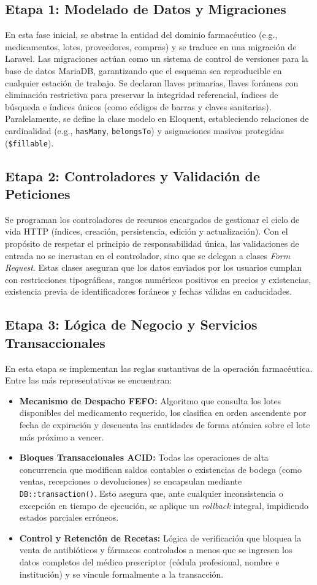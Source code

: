 \subsection{Etapa 1: Modelado de Datos y Migraciones}
En esta fase inicial, se abstrae la entidad del dominio farmacéutico (e.g., medicamentos, lotes, proveedores, compras) y se traduce en una migración de Laravel. Las migraciones actúan como un sistema de control de versiones para la base de datos MariaDB, garantizando que el esquema sea reproducible en cualquier estación de trabajo. Se declaran llaves primarias, llaves foráneas con eliminación restrictiva para preservar la integridad referencial, índices de búsqueda e índices únicos (como códigos de barras y claves sanitarias). Paralelamente, se define la clase modelo en Eloquent, estableciendo relaciones de cardinalidad (e.g., \texttt{hasMany}, \texttt{belongsTo}) y asignaciones masivas protegidas (\texttt{\$fillable}).

\subsection{Etapa 2: Controladores y Validación de Peticiones}
Se programan los controladores de recursos encargados de gestionar el ciclo de vida HTTP (índices, creación, persistencia, edición y actualización). Con el propósito de respetar el principio de responsabilidad única, las validaciones de entrada no se incrustan en el controlador, sino que se delegan a clases \textit{Form Request}. Estas clases aseguran que los datos enviados por los usuarios cumplan con restricciones tipográficas, rangos numéricos positivos en precios y existencias, existencia previa de identificadores foráneos y fechas válidas en caducidades.

\subsection{Etapa 3: Lógica de Negocio y Servicios Transaccionales}
En esta etapa se implementan las reglas sustantivas de la operación farmacéutica. Entre las más representativas se encuentran:
\begin{itemize}
    \item \textbf{Mecanismo de Despacho FEFO:} Algoritmo que consulta los lotes disponibles del medicamento requerido, los clasifica en orden ascendente por fecha de expiración y descuenta las cantidades de forma atómica sobre el lote más próximo a vencer.
    \item \textbf{Bloques Transaccionales ACID:} Todas las operaciones de alta concurrencia que modifican saldos contables o existencias de bodega (como ventas, recepciones o devoluciones) se encapsulan mediante \texttt{DB::transaction()}. Esto asegura que, ante cualquier inconsistencia o excepción en tiempo de ejecución, se aplique un \textit{rollback} integral, impidiendo estados parciales erróneos.
    \item \textbf{Control y Retención de Recetas:} Lógica de verificación que bloquea la venta de antibióticos y fármacos controlados a menos que se ingresen los datos completos del médico prescriptor (cédula profesional, nombre e institución) y se vincule formalmente a la transacción.
\end{itemize}

